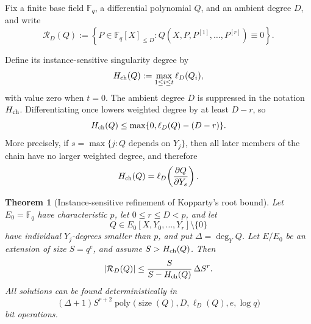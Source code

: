 \documentclass[11pt,letterpaper]{article}
\newtheorem{theorem}{Theorem}[section]
\theoremstyle{definition}
\newcommand{\F}{\mathbb{F}}
\newcommand{\poly}{\operatorname{poly}}
\begin{document}
Fix a finite base field \(\F_q\), a differential polynomial \(Q\), and
an ambient degree \(D\), and write
\begin{equation}
  \mathcal R_D(Q)
  :=
  \left\{
    P\in\F_q[X]_{\le D}:
    Q(X,P,P^{[1]},\ldots,P^{[r]})\equiv0
  \right\}.
  \label{eq:differential-root-set}
\end{equation}

Define its instance-sensitive singularity degree by
\begin{equation}
  H_{\rm ch}(Q):=
  \max_{1\le i\le t}\ell_D(Q_i),
  \label{eq:chain-singularity-degree}
\end{equation}
with value zero when $t=0$. The ambient degree $D$ is suppressed in the
notation $H_{\rm ch}$. Differentiating once lowers weighted degree by
at least $D-r$, so
\begin{equation}
  H_{\rm ch}(Q)
  \le \max\{0,\ell_D(Q)-(D-r)\}.
  \label{eq:chain-singularity-generic-bound}
\end{equation}
More precisely, if \(s=\max\{j:Q\text{ depends on }Y_j\}\), then all
later members of the chain have no larger weighted degree, and therefore
\begin{equation}
  H_{\rm ch}(Q)=
  \ell_D\!\left(\frac{\partial Q}{\partial Y_s}\right).
  \label{eq:chain-singularity-first-separant}
\end{equation}


\begin{theorem}[Instance-sensitive refinement of Kopparty's root bound]
\label{thm:root-bound}
Let $E_0=\F_q$ have characteristic $p$, let $0\le r\le D<p$, and let
\[
  Q\in E_0[X,Y_0,\ldots,Y_r]\setminus\{0\}
\]
have individual $Y_j$-degrees smaller than $p$, and put $\Delta=\deg_YQ$.
Let $E/E_0$ be an extension of size $S=q^e$, and
assume $S>H_{\rm ch}(Q)$. Then
\begin{equation}
  |\mathcal R_D(Q)|
  \le
  \frac{S}{S-H_{\rm ch}(Q)}\,\Delta S^r.
  \label{eq:chain-root-bound}
\end{equation}
All solutions can be found deterministically in
\[
  (\Delta+1)S^{r+2}
  \poly\bigl(\operatorname{size}(Q),D,\ell_D(Q),e,\log q\bigr)
\]
bit operations.
\end{theorem}
\end{document}
